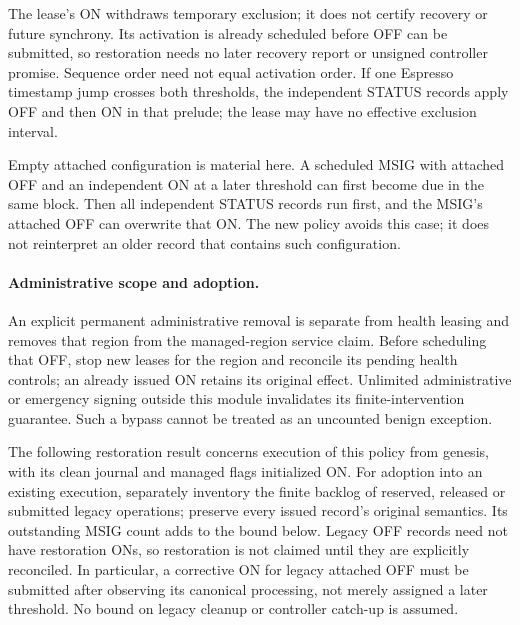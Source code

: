 The lease's ON withdraws temporary exclusion; it does not certify
recovery or future synchrony. Its activation is already scheduled before
OFF can be submitted, so restoration needs no later recovery report or
unsigned controller promise. Sequence order need not equal activation
order. If one Espresso timestamp jump crosses both thresholds, the
independent STATUS records apply OFF and then ON in that prelude; the
lease may have no effective exclusion interval.

Empty attached configuration is material here. A scheduled MSIG with
attached OFF and an independent ON at a later threshold can first become
due in the same block. Then all independent STATUS records run first,
and the MSIG's attached OFF can overwrite that ON. The new policy avoids
this case; it does not reinterpret an older record that contains such
configuration.

\paragraph{Administrative scope and adoption.}
An explicit permanent administrative removal is separate from health
leasing and removes that region from the managed-region service claim.
Before scheduling that OFF, stop new leases for the region and reconcile
its pending health controls; an already issued ON retains its original
effect. Unlimited administrative or emergency signing outside this
module invalidates its finite-intervention guarantee. Such a bypass
cannot be treated as an uncounted benign exception.

The following restoration result concerns execution of this policy from
genesis, with its clean journal and managed flags initialized ON. For
adoption into an existing execution, separately inventory the finite
backlog of reserved, released or submitted legacy operations; preserve
every issued record's original semantics. Its outstanding MSIG count
adds to the bound below. Legacy OFF records need not have restoration
ONs, so restoration is not claimed until they are explicitly reconciled.
In particular, a corrective ON for legacy attached OFF must be submitted
after observing its canonical processing, not merely assigned a later
threshold. No bound on legacy cleanup or controller catch-up is assumed.

